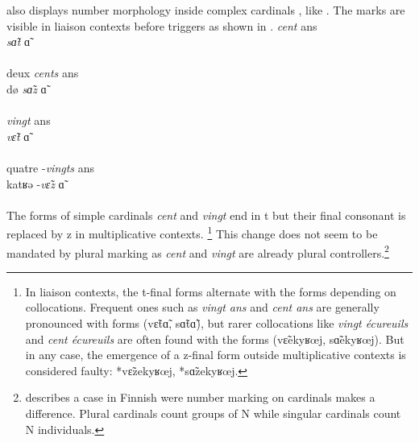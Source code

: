 \documentclass[output=paper]{langsci/langscibook}
\begin{document}
 also displays number morphology inside complex cardinals , like . The marks are visible in liaison  contexts before triggers as shown in .
\ea\label{numCards}
	\ea\gll \emph{cent} ans \\ \emph{sɑ̃t %
} ɑ̃ %
 \\ \\
	\ex\gll deux \emph{cents} ans \\ dø %
 \emph{sɑ̃z %
} ɑ̃ %
 \\ \\
	\ex\gll \emph{vingt} ans \\ \emph{vɛ̃t %
} ɑ̃ %
 \\ \\
	\ex\gll quatre -\emph{vingts} ans \\ katʁə %
-\emph{vɛ̃z %
} ɑ̃ %
 \\ \\
	\z
\z
The  \lplus{} forms of simple cardinals  \emph{cent} and \emph{vingt} end in t %
 but their final consonant is replaced by z %
 in multiplicative contexts.%
\footnote{In liaison  contexts, the t-final %
 \lplus{} forms alternate with the \lmoins{} forms depending on collocations. Frequent ones such as \emph{vingt ans}  and \emph{cent ans}  are generally pronounced with \lplus{} forms (vɛ̃t\lplus{}ɑ̃, sɑ̃t\lplus{}ɑ̃), but rarer collocations like \emph{vingt écureuils}   and \emph{cent écureuils}  are often found with the \lpause{} forms (vɛ̃\lpause{}ekyʁœj, sɑ̃\lpause{}ekyʁœj). But in any case, the emergence of a z-final \lplus{} form outside multiplicative contexts is considered faulty: *vɛ̃z\lplus{}ekyʁœj, *sɑ̃z\lplus{}ekyʁœj.}
This change does not seem to be mandated by plural marking as \emph{cent} and \emph{vingt} are already plural controllers.\footnote{\cite[Section 3]{Hurford98} describes a case in Finnish were number marking on cardinals  makes a difference. Plural cardinals  count groups of N while singular cardinals  count N individuals.}
\end{document}
